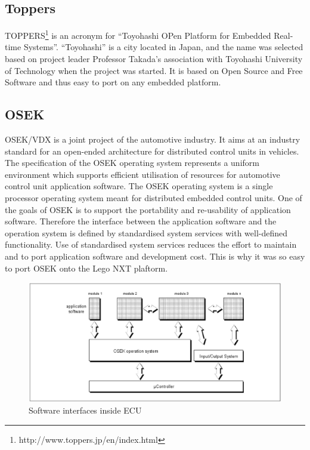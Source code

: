 \subsection{Toppers}
TOPPERS\footnote{http://www.toppers.jp/en/index.html} is an acronym for “Toyohashi OPen Platform for Embedded Real-time Systems”. “Toyohashi” is a city located in Japan, and the name was selected based on project leader Professor Takada’s association with Toyohashi University of Technology when the project was started.
It is based on Open Source and Free Software and thus easy to port on any
embedded platform.

\subsection{OSEK}

OSEK/VDX is a joint project of the automotive industry. It aims at an industry standard for an
open-ended architecture for distributed control units in vehicles.
The specification of the OSEK operating system represents a uniform environment which
supports efficient utilisation of resources for automotive control unit application software. The
OSEK operating system is a single processor operating system meant for distributed
embedded control units.
One of the goals of OSEK is to support the portability and re-usability of application software.
Therefore the interface between the application software and the operation system is defined
by standardised system services with well-defined functionality. Use of standardised system
services reduces the effort to maintain and to port application software and development cost.
This is why it was so easy to port OSEK onto the Lego NXT plaftorm.
\begin{figure}[htbp]
\begin{center}
\includegraphics[scale=0.4]{figures/nxtosek/osek1.eps}
\caption{Software interfaces inside ECU}
\end{center}
\end{figure}
